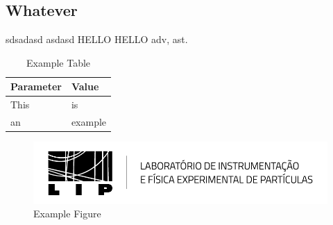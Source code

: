 \subsection{Whatever}

sdsadasd \cite{example} asdasd \cite{leo} HELLO HELLO \acrshort{adv}, \acrlong{ast}.


\lipsum[1]
\begin{table}[H]
    \centering
    \begin{tabular}{| l | l| }
    \hline
     \rowcolor{Gray}\textbf{Parameter} & \textbf{Value} \\
     \hline
      This   &  is \\
      \hline
      an & example \\
      \hline
    \end{tabular}
    \caption{Example Table}
    \label{tab:example_table}
\end{table}

\begin{figure}[H]
    \centering
    \includegraphics[width=\textwidth]{Figs/entities/LIP.png}
    \caption{Example Figure}
    \label{fig:example_figure}
\end{figure}

\lipsum[1]